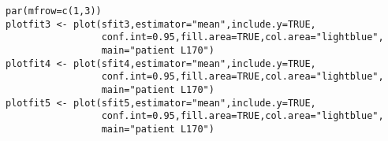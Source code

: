 \documentclass[11pt,twoside]{article}
\numberwithin{Theorem}{section}
\numberwithin{Definition}{section}
\numberwithin{Lemma}{section}
\numberwithin{Algorithm}{section}
\numberwithin{equation}{section}
\begin{document}
\begin{lstlisting}
par(mfrow=c(1,3))
plotfit3 <- plot(sfit3,estimator="mean",include.y=TRUE,
                 conf.int=0.95,fill.area=TRUE,col.area="lightblue",
                 main="patient L170")
plotfit4 <- plot(sfit4,estimator="mean",include.y=TRUE,
                 conf.int=0.95,fill.area=TRUE,col.area="lightblue",
                 main="patient L170")
plotfit5 <- plot(sfit5,estimator="mean",include.y=TRUE,
                 conf.int=0.95,fill.area=TRUE,col.area="lightblue",
                 main="patient L170")


\end{lstlisting}
\end{document}
